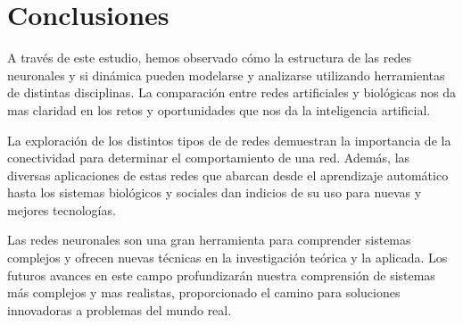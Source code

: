 \section{Conclusiones}
A través de este estudio, hemos observado cómo la estructura de las redes neuronales y si dinámica pueden modelarse y analizarse utilizando herramientas de distintas disciplinas. La comparación entre redes artificiales y biológicas nos da mas claridad en los retos y oportunidades que nos da la inteligencia artificial.

La exploración de los distintos tipos de de redes demuestran la importancia de la conectividad para determinar el comportamiento de una red. Además, las diversas aplicaciones de estas redes que abarcan desde el aprendizaje automático hasta los sistemas biológicos y sociales dan indicios de su uso para nuevas y mejores tecnologías.

Las redes neuronales son una gran herramienta para comprender sistemas complejos y ofrecen nuevas técnicas en la investigación teórica y la aplicada. Los futuros avances en este campo profundizarán nuestra comprensión de sistemas más complejos y mas realistas, proporcionado el camino para soluciones innovadoras a problemas del mundo real.